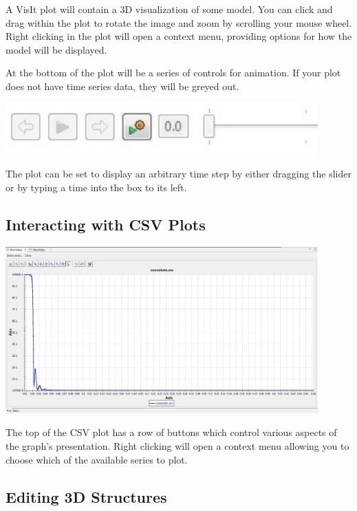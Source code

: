 \documentclass{article}
\begin{document}
A VisIt plot will contain a 3D visualization of some model. You can click and
drag within the plot to rotate the image and zoom by scrolling your mouse wheel.
Right clicking in the plot will open a context menu, providing options for how
the model will be displayed.

At the bottom of the plot will be a series of controls for animation. If your
plot does not have time series data, they will be greyed out. 

\begin{center}
\includegraphics[width=12cm]{images/TimeSliderWidget} 
\end{center}

The plot can be set to display an arbitrary time step by either dragging the
slider or by typing a time into the box to its left.

\subsection{Interacting with CSV Plots}

\begin{center}
\includegraphics[width=12cm]{images/CSVGraph}
\end{center}

The top of the CSV plot has a row of buttons which control various aspects of
the graph's presentation. Right clicking will open a context menu allowing you
to choose which of the available series to plot.

\subsection{Editing 3D Structures}
\end{document}
